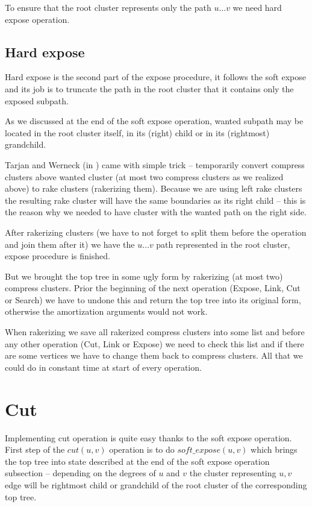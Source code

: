 To ensure that the root cluster represents only the path $u\dots v$ we need hard
expose operation.

\subsection{Hard expose}

Hard expose is the second part of the expose procedure, it follows the soft
expose and its job is to truncate the path in the root cluster that it contains
only the exposed subpath.

As we discussed at the end of the soft expose operation, wanted subpath may be
located in the root cluster itself, in its (right) child or in its (rightmost)
grandchild.

Tarjan and Werneck (in \cite{SelfAdjustingTT}) came with simple trick -- temporarily
convert compress clusters above wanted cluster (at most two compress clusters as
we realized above) to rake clusters ({\I rakerizing} them). Because we are using
left rake clusters the resulting rake cluster will have the same boundaries as
its right child -- this is the reason why we needed to have cluster with the
wanted path on the right side.

After rakerizing clusters (we have to not forget to split them before the
operation and join them after it) we have the $u\dots v$ path represented in
the root cluster, expose procedure is finished.

But we brought the top tree in some ugly form by rakerizing (at most two)
compress clusters. Prior the beginning of the next operation (Expose, Link, Cut
or Search) we have to undone this and return the top tree into its original
form, otherwise the amortization arguments would not work.

When rakerizing we save all rakerized compress clusters into some list and
before any other operation (Cut, Link or Expose) we need to check this list and
if there are some vertices we have to change them back to compress clusters.
All that we could do in constant time at start of every operation.

\section{Cut}

Implementing cut operation is quite easy thanks to the soft expose operation.
First step of the $cut(u,v)$ operation is to do $soft\_expose(u,v)$ which brings
the top tree into state described at the end of the soft expose operation
subsection -- depending on the degrees of $u$ and $v$ the cluster representing
$u,v$ edge will be rightmost child or grandchild of the root cluster of the
corresponding top tree.

